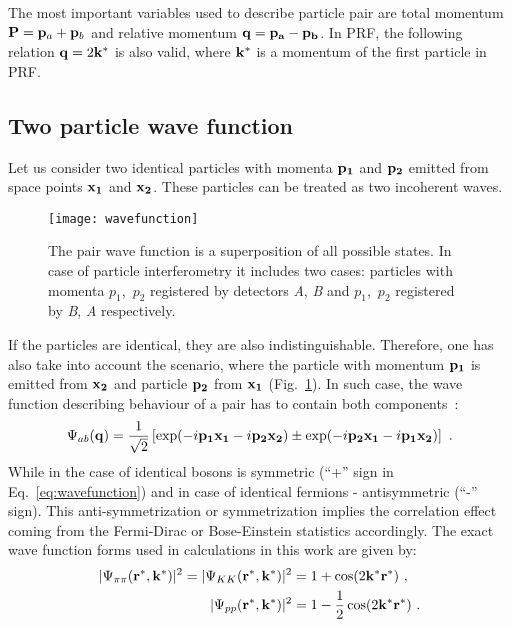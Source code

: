       The most important variables used to describe particle pair are total momentum $\mathbf{P} = \mathbf{p}_a + \mathbf{p}_b$ and relative momentum $\mathbf{q} = \mathbf{p_a} - \mathbf{p_b}$.
      In PRF, the following relation $\mathbf{q} = 2 \mathbf{k}^{*}$ is also valid, where $\mathbf{k}^{*}$ is a momentum of the first particle in PRF.

    \subsection{Two particle wave function}
      Let us consider two identical particles with momenta $\mathbf{p_1}$ and $\mathbf{p_2}$ emitted from space points $\mathbf{x_1}$ and $\mathbf{x_2}$.
      These particles can be treated as two incoherent waves.
      \begin{figure}[h]
        \centering
        \texttt{[image: wavefunction]}
        \caption{The pair wave function is a superposition of all possible states. In case of particle interferometry it includes two cases: particles with momenta $p_1$,~$p_2$ registered by detectors \textit{A}, \textit{B} and $p_1$,~$p_2$ registered by \textit{B}, \textit{A} respectively.}
        \label{fig:wavefunction}
      \end{figure}
      If the particles are identical, they are also indistinguishable.
      Therefore, one has also take into account the scenario, where the particle with momentum $\mathbf{p_1}$ is emitted from $\mathbf{x_2}$ and particle $\mathbf{p_2}$ from $\mathbf{x_1}$ (Fig.~\ref{fig:wavefunction}).
      In such case, the wave function describing behaviour of a pair has to contain both components~\cite{drkisiel}:
      \begin{equation}
      \label{eq:wavefunction}
        \Psi_{ab}(\mathbf{q})=\frac{1}{\sqrt{2}} \left[ \exp(- i \mathbf{p_1}\mathbf{x_1} - i \mathbf{p_2}\mathbf{x_2}) \pm \exp(- i \mathbf{p_2}\mathbf{x_1} - i \mathbf{p_1}\mathbf{x_2}) \right]~.
      \end{equation}
      While in the case of identical bosons is symmetric (``+'' sign in Eq.~\ref{eq:wavefunction}) and in case of identical fermions - antisymmetric (``-'' sign).
      This anti-symmetrization or symmetrization implies the correlation effect coming from the Fermi-Dirac or Bose-Einstein statistics accordingly.
      The exact wave function forms used in calculations in this work are given by:
      \begin{align}
        \label{eq:pipi-wf}
        |\Psi_{\pi\pi}(\mathbf{r^*},\mathbf{k^*})|^2 = |\Psi_{KK}(\mathbf{r^*},\mathbf{k^*})|^2 &= 1 + \cos(2 \mathbf{k^*} \mathbf{r^*})~, \\
        \label{eq:pp-wf}
        |\Psi_{pp}(\mathbf{r^*},\mathbf{k^*})|^2 &= 1 - \frac{1}{2} \cos(2 \mathbf{k^*} \mathbf{r^*})~.
      \end{align}
